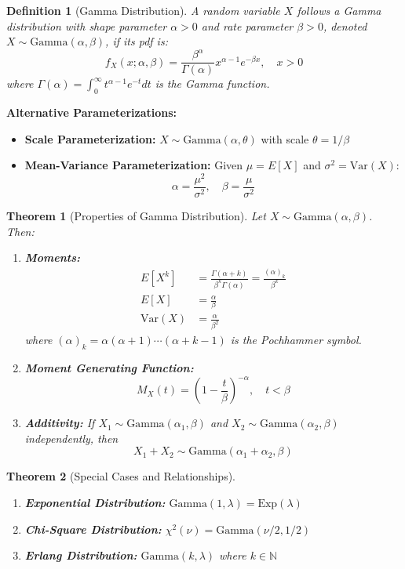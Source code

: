 \documentclass[12pt,a4paper]{article}
\newtheorem{theorem}{Theorem}[section]
\newtheorem{definition}{Definition}[section]
\theoremstyle{remark}
\begin{document}
\begin{definition}[Gamma Distribution]
A random variable $X$ follows a Gamma distribution with shape parameter $\alpha > 0$ and rate parameter $\beta > 0$, denoted $X \sim \text{Gamma}(\alpha, \beta)$, if its pdf is:
$$f_X(x; \alpha, \beta) = \frac{\beta^\alpha}{\Gamma(\alpha)} x^{\alpha-1} e^{-\beta x}, \quad x > 0$$
where $\Gamma(\alpha) = \int_0^\infty t^{\alpha-1} e^{-t} dt$ is the Gamma function.
\end{definition}

\textbf{Alternative Parameterizations:}
\begin{itemize}
\item \textbf{Scale Parameterization:} $X \sim \text{Gamma}(\alpha, \theta)$ with scale $\theta = 1/\beta$
\item \textbf{Mean-Variance Parameterization:} Given $\mu = E[X]$ and $\sigma^2 = \text{Var}(X)$:
  $$\alpha = \frac{\mu^2}{\sigma^2}, \quad \beta = \frac{\mu}{\sigma^2}$$
\end{itemize}

\begin{theorem}[Properties of Gamma Distribution]
Let $X \sim \text{Gamma}(\alpha, \beta)$. Then:
\begin{enumerate}
\item \textbf{Moments:}
   \begin{align}
   E[X^k] &= \frac{\Gamma(\alpha + k)}{\beta^k \Gamma(\alpha)} = \frac{(\alpha)_k}{\beta^k}\\
   E[X] &= \frac{\alpha}{\beta}\\
   \text{Var}(X) &= \frac{\alpha}{\beta^2}
   \end{align}
   where $(\alpha)_k = \alpha(\alpha+1)\cdots(\alpha+k-1)$ is the Pochhammer symbol.
\item \textbf{Moment Generating Function:}
   $$M_X(t) = \left(1 - \frac{t}{\beta}\right)^{-\alpha}, \quad t < \beta$$
\item \textbf{Additivity:} If $X_1 \sim \text{Gamma}(\alpha_1, \beta)$ and $X_2 \sim \text{Gamma}(\alpha_2, \beta)$ independently, then
   $$X_1 + X_2 \sim \text{Gamma}(\alpha_1 + \alpha_2, \beta)$$
\end{enumerate}
\end{theorem}

\begin{theorem}[Special Cases and Relationships]
\begin{enumerate}
\item \textbf{Exponential Distribution:} $\text{Gamma}(1, \lambda) = \text{Exp}(\lambda)$
\item \textbf{Chi-Square Distribution:} $\chi^2(\nu) = \text{Gamma}(\nu/2, 1/2)$
\item \textbf{Erlang Distribution:} $\text{Gamma}(k, \lambda)$ where $k \in \mathbb{N}$
\end{enumerate}
\end{theorem}
\end{document}

